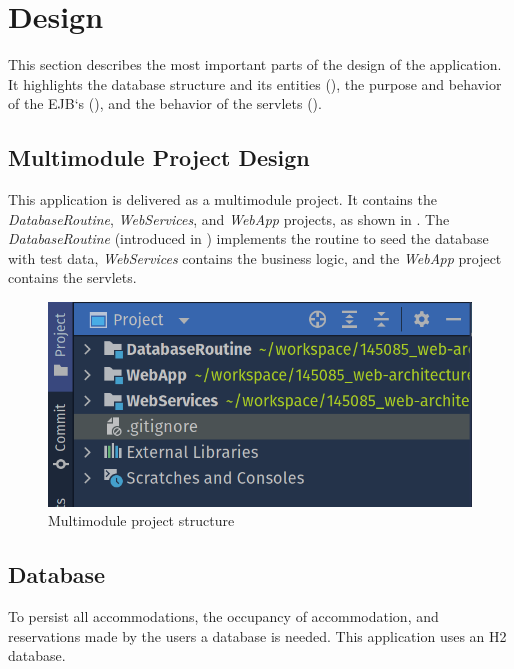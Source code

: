 \section{Design}\label{sec:02_design}
This section describes the most important parts of the design of the application. It highlights the database structure and its entities (), the purpose and behavior of the EJB`s (), and the behavior of the servlets ().


\subsection{Multimodule Project Design}\label{sec:02_design_project}
This application is delivered as a multimodule project. It contains the \textit{DatabaseRoutine}, \textit{WebServices}, and \textit{WebApp} projects, as shown in .
The \textit{DatabaseRoutine} (introduced in ) implements the routine to seed the database with test data, \textit{WebServices} contains the business logic, and the \textit{WebApp} project contains the servlets.
\begin{figure}[h]
\centering
\includegraphics[scale=0.5]{images/02_design/design-project}
\caption{Multimodule project structure}
\label{fig:02_design_project_structure}
\end{figure}


\subsection{Database}\label{sec:02_design_db}
To persist all accommodations, the occupancy of accommodation, and reservations made by the users a database is needed. This application uses an H2 database.


